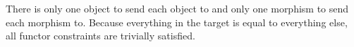 There is only one object to send each object to and only one morphism to send each morphism to. Because everything in the target is equal to everything else, all functor constraints are trivially satisfied.
